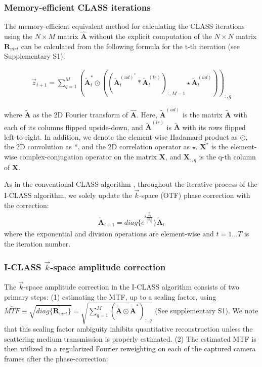 \documentclass[pdflatex,sn-mathphys-num]{sn-jnl}%
\theoremstyle{thmstyleone}%
\theoremstyle{thmstyletwo}%
\theoremstyle{thmstylethree}%
\begin{document}
\subsubsection*{Memory-efficient CLASS iterations}

The memory-efficient equivalent method for calculating the CLASS iterations using the $N \times M$ matrix $\hat{\textbf{A}}$ without the explicit computation of the $N \times N$ matrix $\textbf{R}_{virt}$ can be calculated from the following formula for the t-th iteration (see Supplementary S1): 

\begin{eqnarray}
\vec{z}_{t+1}=\sum_{q=1}^{M}(\tilde{\textbf{A}}_t^* \odot ((\tilde{\textbf{A}}_t^{(ud)^*}*\tilde{\textbf{A}}_t^{(lr)})_{:,M-1} \star \tilde{\textbf{A}}_t^{(ud)}))_{:,q}
\label{eq:three}
\end{eqnarray}

\noindent where $\tilde{\textbf{A}}$ as the 2D Fourier transform of $\hat{\textbf{A}}$. Here, $\tilde{\textbf{A}}^{(ud)}$ is the matrix $\tilde{\textbf{A}}$ with each of its columns flipped upside-down, and $\tilde{\textbf{A}}^{(lr)}$ is $\tilde{\textbf{A}}$ with its rows flipped left-to-right. In addition, we denote the element-wise Hadamard product as $\odot$, the 2D convolution as $*$, and the 2D correlation operator as $\star$. $\textbf{X}^{*}$ is the element-wise complex-conjugation operator on the matrix $\textbf{X}$, and $\textbf{X}_{:,q}$ is the q-th column of $\textbf{X}$.

As in the conventional CLASS algorithm \cite{kang17}, throughout the iterative process of the I-CLASS algorithm, we solely update the $\vec{k}$-space (OTF) phase correction with the correction:
\begin{eqnarray}
\tilde{\textbf{A}}_{t+1}=diag\{e^{i\frac{\vec{z}_t}{|\vec{z}_t|}}\}\tilde{\textbf{A}}_t
\end{eqnarray}
\noindent where the exponential and division operations are element-wise and $t=1...T$ is the iteration number. 
 \subsubsection*{I-CLASS $\vec{k}$-space amplitude correction}

The $\vec{k}$-space amplitude correction in the I-CLASS algorithm consists of two primary steps: (1) estimating the MTF, up to a scaling factor, using $\widehat{MTF} \equiv  \sqrt{diag\{ \tilde{\textbf{R}_{virt}} \}} = \sqrt{\sum_{q=1}^{M} (\tilde{\textbf{A}} \odot \tilde{\textbf{A}}^*)_{:,q}}$ (See supplementary S1). We note that this scaling factor ambiguity inhibits quantitative reconstruction unless the scattering medium transmission is properly estimated. (2) The estimated MTF is then utilized in a regularized Fourier reweighting on each of the captured camera frames after the phase-correction:%
\end{document}
